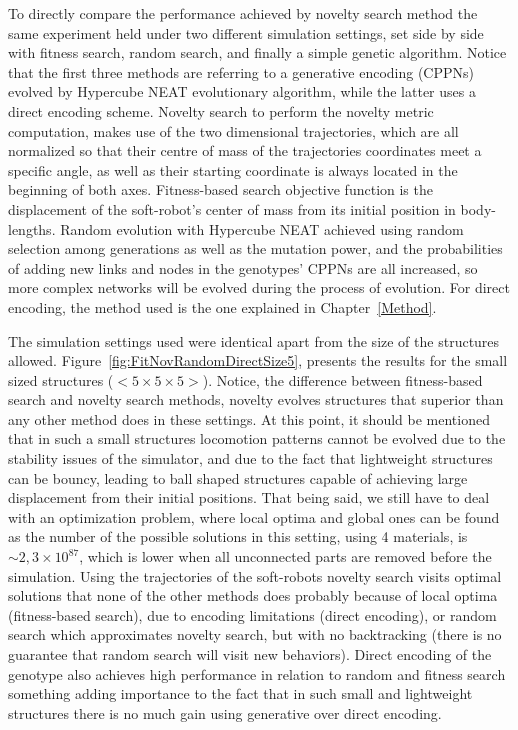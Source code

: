 To directly compare the performance achieved by novelty search method the same experiment held under two different simulation settings, set side by side with fitness search, random search, and finally a simple genetic algorithm. Notice that the first three methods are referring to a generative encoding (CPPNs) evolved by Hypercube NEAT evolutionary algorithm, while the latter uses a direct encoding scheme. Novelty search to perform the novelty metric computation, makes use of the two dimensional trajectories, which are all normalized so that their centre of mass of the trajectories coordinates meet a specific angle, as well as their starting coordinate is always located in the beginning of both axes. Fitness-based search objective function is the displacement of the soft-robot's center of mass from its initial position in body-lengths. Random evolution with Hypercube NEAT achieved using random selection among generations as well as the mutation power, and the probabilities of adding new links and nodes in the genotypes' CPPNs are all increased, so more complex networks will be evolved during the process of evolution. For direct encoding, the method used is the one explained in Chapter~\ref{Method}. 

The simulation settings used were identical apart from the size of the structures allowed. Figure~\ref{fig:FitNovRandomDirectSize5}, presents the results for the small sized structures ($<5 \times 5 \times 5>$). Notice, the difference between fitness-based search and novelty search methods, novelty evolves structures that superior than any other method does in these settings. At this point, it should be mentioned that in such a small structures locomotion patterns cannot be evolved due to the stability issues of the simulator, and due to the fact that lightweight structures can be bouncy, leading to ball shaped structures capable of achieving large displacement from their initial positions. That being said, we still have to deal with an optimization problem, where local optima and global ones can be found as the number of the possible solutions in this setting, using 4 materials, is $\sim 2,3 \times 10^{87}$, which is lower when all unconnected parts are removed before the simulation. Using the trajectories of the soft-robots novelty search visits optimal solutions that none of the other methods does probably because of local optima (fitness-based search), due to encoding limitations (direct encoding), or random search which approximates novelty search, but with no backtracking (there is no guarantee that random search will visit new behaviors). Direct encoding of the genotype also achieves high performance in relation to random and fitness search something adding importance to the fact that in such small and lightweight structures there is no much gain using generative over direct encoding. 

